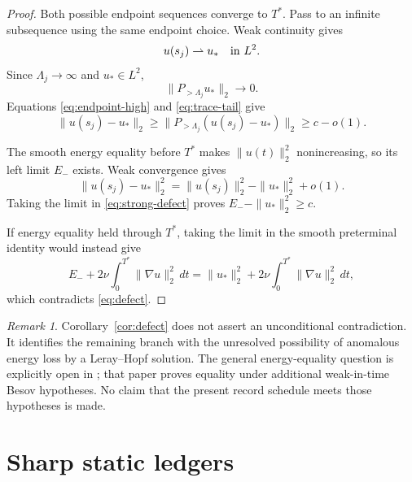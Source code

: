 \documentclass[11pt]{article}
\theoremstyle{remark}
\newtheorem{remark}[theorem]{Remark}
\begin{document}
\begin{proof}
Both possible endpoint sequences converge to \(T^*\).  Pass to an
infinite subsequence using the same endpoint choice.  Weak continuity
gives
\begin{equation}
 \label{eq:weak}
 u(s_j)\rightharpoonup u_*
 \quad\hbox{in }L^2.
\end{equation}
Since \(\Lambda_j\to\infty\) and \(u_*\in L^2\),
\begin{equation}
 \label{eq:trace-tail}
 \|P_{>\Lambda_j}u_*\|_2\longrightarrow0.
\end{equation}
Equations \eqref{eq:endpoint-high} and \eqref{eq:trace-tail} give
\begin{equation}
 \label{eq:strong-defect}
 \|u(s_j)-u_*\|_2
 \geq
 \|P_{>\Lambda_j}(u(s_j)-u_*)\|_2
 \geq c-o(1).
\end{equation}

The smooth energy equality before \(T^*\) makes
\(\|u(t)\|_2^2\) nonincreasing, so its left limit \(E_-\) exists.
Weak convergence gives
\[
 \|u(s_j)-u_*\|_2^2
 =
 \|u(s_j)\|_2^2-\|u_*\|_2^2+o(1).
\]
Taking the limit in \eqref{eq:strong-defect} proves
\(E_--\|u_*\|_2^2\geq c\).

If energy equality held through \(T^*\), taking the limit in the smooth
preterminal identity would instead give
\[
 E_-+2\nu\int_0^{T^*}\|\nabla u\|_2^2\,dt
 =
 \|u_*\|_2^2
 +2\nu\int_0^{T^*}\|\nabla u\|_2^2\,dt,
\]
which contradicts \eqref{eq:defect}.
\end{proof}

\begin{remark}
Corollary~\ref{cor:defect} does not assert an unconditional
contradiction.  It identifies the remaining branch with the unresolved
possibility of anomalous energy loss by a Leray--Hopf solution.  The
general energy-equality question is explicitly open in
\cite{CL20}; that paper proves equality under additional weak-in-time
Besov hypotheses.  No claim that the present record schedule meets those
hypotheses is made.
\end{remark}

\section{Sharp static ledgers}
\label{sec:sharpness}
\end{document}
